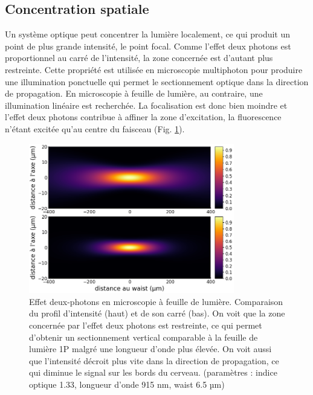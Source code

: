 \subsection{Concentration spatiale}
 
Un système optique peut concentrer la lumière localement, ce qui produit un point de plus grande intensité, le point focal. Comme l'effet deux photons est proportionnel au carré de l'intensité, la zone concernée est d'autant plus restreinte. Cette propriété est utilisée en microscopie multiphoton pour produire une illumination ponctuelle qui permet le sectionnement optique dans la direction de propagation. En microscopie à feuille de lumière, au contraire, une illumination linéaire est recherchée. La focalisation est donc bien moindre et l'effet deux photons contribue à affiner la zone d'excitation, la fluorescence n'étant excitée qu'au centre du faisceau (Fig. \ref{FIG2P-intensity-profile}).


\begin{figure}[p]
    \centering
    \includegraphics[width=0.8\textwidth]{./files/profile-intensity.png}
    \caption{Effet deux-photons en microscopie à feuille de lumière. Comparaison du profil d'intensité (haut) et de son carré (bas). On voit que la zone concernée par l'effet deux photons est restreinte, ce qui permet d'obtenir un sectionnement vertical comparable à la feuille de lumière 1P malgré une longueur d'onde plus élevée. On voit aussi que l'intensité décroit plus vite dans la direction de propagation, ce qui diminue le signal sur les bords du cerveau. (paramètres : indice optique 1.33, longueur d'onde 915 nm, waist 6.5 µm)}
    \label{FIG2P-intensity-profile}
    \end{figure}

